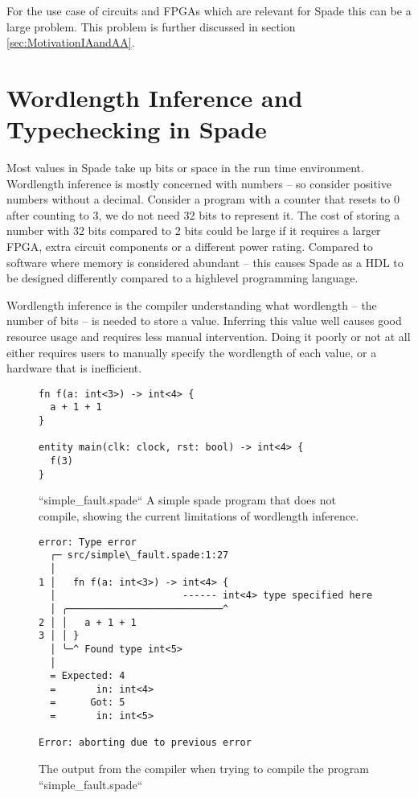 \documentclass[msc,lith,english]{liuthesis}
\begin{document}
For the use case of circuits and FPGAs which are relevant for Spade this can be a large problem. This problem is further discussed in section \ref{sec:MotivationIAandAA}.


\cite{src:affAri}

\section{Wordlength Inference and Typechecking in Spade}
\label{sec:TheProblem}
Most values in Spade take up bits or space in the run time environment. Wordlength inference is mostly concerned with numbers -- so consider positive numbers without a decimal. Consider a program with a counter that resets to 0 after counting to 3, we do not need 32 bits to represent it. The cost of storing a number with 32 bits compared to 2 bits could be large if it requires a larger FPGA, extra circuit components or a different power rating. Compared to software where memory is considered abundant -- this causes Spade as a HDL to be designed differently compared to a highlevel programming language.

Wordlength inference is the compiler understanding what wordlength -- the number of bits -- is needed to store a value. Inferring this value well causes good resource usage and requires less manual intervention. Doing it poorly or not at all either requires users to manually specify the wordlength of each value, or a hardware that is inefficient.

\begin{figure}[h]
\begin{center}
\begin{verbatim}
fn f(a: int<3>) -> int<4> {
  a + 1 + 1
}

entity main(clk: clock, rst: bool) -> int<4> {
  f(3)
}
\end{verbatim}
\end{center}
\label{fig:SimpleFaultSpade}
\caption{``simple\_fault.spade`` A simple spade program that does not compile, showing the current limitations of wordlength inference.}
\end{figure}

\begin{figure}[h]
\begin{center}
\begin{verbatim}
error: Type error
  ┌─ src/simple\_fault.spade:1:27
  │
1 │   fn f(a: int<3>) -> int<4> {
  │                      ------ int<4> type specified here
  │ ╭───────────────────────────^
2 │ │   a + 1 + 1
3 │ │ }
  │ ╰─^ Found type int<5>
  │
  = Expected: 4
  =       in: int<4>
  =      Got: 5
  =       in: int<5>

Error: aborting due to previous error
\end{verbatim}
\end{center}
\label{fig:SimpleFaultSpadeCompileOutput}
\caption{The output from the compiler when trying to compile the program ``simple\_fault.spade``}
\end{figure}
\end{document}
